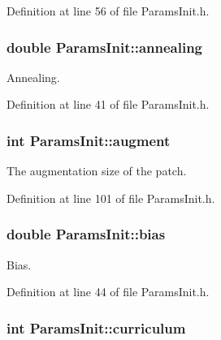 Definition at line 56 of file Params\+Init.\+h.

\subsubsection[{\texorpdfstring{annealing}{annealing}}]{\setlength{\rightskip}{0pt plus 5cm}double Params\+Init\+::annealing}\hypertarget{classParamsInit_add858efe10c28c501be79318a041811e}{}\label{classParamsInit_add858efe10c28c501be79318a041811e}


Annealing. 



Definition at line 41 of file Params\+Init.\+h.

\subsubsection[{\texorpdfstring{augment}{augment}}]{\setlength{\rightskip}{0pt plus 5cm}int Params\+Init\+::augment}\hypertarget{classParamsInit_a35823956c18d02a7368e96374741715f}{}\label{classParamsInit_a35823956c18d02a7368e96374741715f}


The augmentation size of the patch. 



Definition at line 101 of file Params\+Init.\+h.

\subsubsection[{\texorpdfstring{bias}{bias}}]{\setlength{\rightskip}{0pt plus 5cm}double Params\+Init\+::bias}\hypertarget{classParamsInit_a31710ca6cd4d0d80f994b45554ba00b0}{}\label{classParamsInit_a31710ca6cd4d0d80f994b45554ba00b0}


Bias. 



Definition at line 44 of file Params\+Init.\+h.

\subsubsection[{\texorpdfstring{curriculum}{curriculum}}]{\setlength{\rightskip}{0pt plus 5cm}int Params\+Init\+::curriculum}\hypertarget{classParamsInit_a7a7a2071cd2454eef8f2a1a0515cff0c}{}\label{classParamsInit_a7a7a2071cd2454eef8f2a1a0515cff0c}


